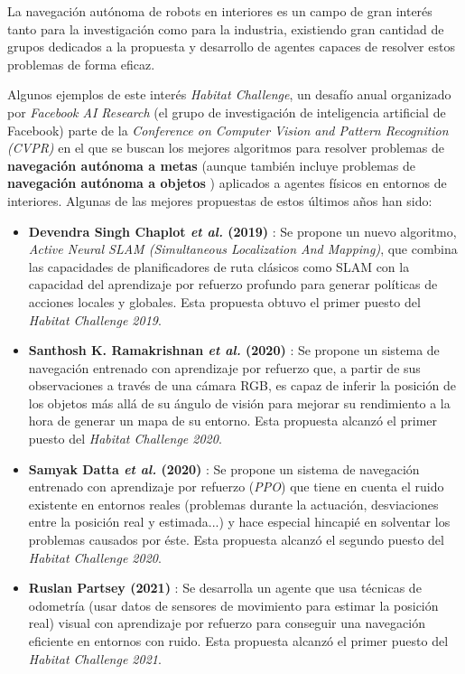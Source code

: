 La navegación autónoma de robots en interiores es un campo de gran interés tanto para la investigación como para la industria, existiendo gran cantidad de grupos dedicados a la propuesta y desarrollo de agentes capaces de resolver estos problemas de forma eficaz.

Algunos ejemplos de este interés \textit{Habitat Challenge}, un desafío anual organizado por  \textit{Facebook AI Research} (el grupo de investigación de inteligencia artificial de Facebook) parte de la \textit{Conference on Computer Vision and Pattern Recognition (CVPR)} en el que se buscan los mejores algoritmos para resolver problemas de \textbf{navegación autónoma a metas} \cite{habitat2020sim2real} (aunque también incluye problemas de \textbf{navegación autónoma a objetos} \cite{batra2020objectnav}) aplicados a agentes físicos en entornos de interiores. Algunas de las mejores propuestas de estos últimos años han sido:
 
\begin{itemize}
	\item \textbf{Devendra Singh Chaplot \textit{et al.} (2019)} \cite{DBLP:journals/corr/abs-2004-05155}: Se propone un nuevo algoritmo, \textit{Active Neural SLAM (Simultaneous Localization And Mapping)}, que combina las capacidades de planificadores de ruta clásicos como SLAM con la capacidad del aprendizaje por refuerzo profundo para generar políticas de acciones locales y globales. Esta propuesta obtuvo el primer puesto del \textit{Habitat Challenge 2019}.
	\item \textbf{Santhosh K. Ramakrishnan \textit{et al.} (2020)} \cite{DBLP:journals/corr/abs-2008-09285}: Se propone un sistema de navegación entrenado con aprendizaje por refuerzo que, a partir de sus observaciones a través de una cámara RGB, es capaz de inferir la posición de los objetos más allá de su ángulo de visión para mejorar su rendimiento a la hora de generar un mapa de su entorno. Esta propuesta alcanzó el primer puesto del \textit{Habitat Challenge 2020}.
	 \item \textbf{Samyak Datta \textit{et al.} (2020)} \cite{DBLP:journals/corr/abs-2009-03231}: Se propone un sistema de navegación entrenado con aprendizaje por refuerzo (\textit{PPO}) que tiene en cuenta el ruido existente en entornos reales (problemas durante la actuación, desviaciones entre la posición real y estimada...) y hace especial hincapié en solventar los problemas causados por éste. Esta propuesta alcanzó el segundo puesto del \textit{Habitat Challenge 2020}.
	 \item \textbf{Ruslan Partsey (2021)} \cite{Partsey2021}: Se desarrolla un agente que usa técnicas de odometría (usar datos de sensores de movimiento para estimar la posición real) visual con aprendizaje por refuerzo para conseguir una navegación eficiente en entornos con ruido. Esta propuesta alcanzó el primer puesto del \textit{Habitat Challenge 2021}.
\end{itemize}

